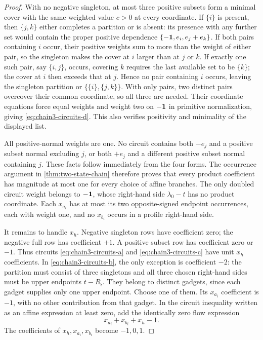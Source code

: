 \begin{proof}
With no negative singleton, at most three positive subsets form a
minimal cover with the same weighted value $c>0$ at every coordinate.
If $\{i\}$ is present, then $\{j,k\}$ either completes a partition
or is absent: its presence with any further set would contain the
proper positive dependence $\{-\mathbf 1,e_i,e_j+e_k\}$.
If both pairs containing $i$ occur, their positive weights sum to
more than the weight of either pair, so the singleton makes the cover
at $i$ larger than at $j$ or $k$. If exactly one such pair, say
$\{i,j\}$, occurs, covering $k$ requires the last available set
to be $\{k\}$; the cover at $i$ then exceeds that at $j$.
Hence no pair containing $i$ occurs, leaving the singleton partition
or $\{\{i\},\{j,k\}\}$. With only pairs, two distinct pairs
overcover their common coordinate, so all three are needed. Their
coordinate equations force equal weights and weight two on $-\mathbf 1$
in primitive normalization, giving \eqref{eq:chain3-circuits-d}.
This also verifies positivity and minimality of the displayed list.

All positive-normal weights are one. No circuit contains both
$-e_j$ and a positive subset normal excluding $j$, or both
$+e_j$ and a different positive subset normal containing $j$.
These facts follow immediately from the four forms. The occurrence
argument in \cref{thm:two-state-chain} therefore proves that every
product coefficient has magnitude at most one for every choice of
affine branches. The only doubled circuit weight belongs to
$-\mathbf 1$, whose right-hand side $\lambda_0-t$ has no product
coordinate. Each $x_{a_i}$ has at most its two opposite-signed
endpoint occurrences, each with weight one, and no $x_{b_i}$
occurs in a profile right-hand side.

It remains to handle $x_h$. Negative singleton rows have coefficient
zero; the negative full row has coefficient $+1$. A positive
subset row has coefficient zero or $-1$. Thus circuits
\eqref{eq:chain3-circuits-a} and \eqref{eq:chain3-circuits-c}
have unit $x_h$ coefficients. In
\eqref{eq:chain3-circuits-b}, the only exception is coefficient
$-2$: the partition must consist of three singletons and all three
chosen right-hand sides must be upper endpoints $t-R_i$.
They belong to distinct gadgets, since each gadget supplies only
one upper endpoint. Choose one of them. Its $x_{a_i}$ coefficient
is $-1$, with no other contribution from that gadget. In the
circuit inequality written as an affine expression at least zero,
add the identically zero flow expression
\[
 x_{a_i}+x_{b_i}+x_h-1.
\]
The coefficients of $x_h,x_{a_i},x_{b_i}$ become $-1,0,1$.


\end{proof}
